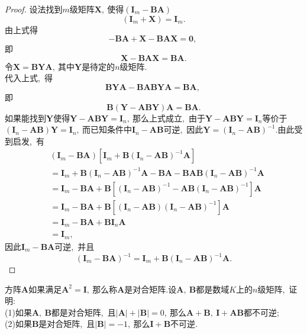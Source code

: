 \begin{proof}
	设法找到$m$级矩阵$\boldsymbol{X},\ $使得$(\boldsymbol{I}_m-\boldsymbol{BA})$
	$$(\boldsymbol{I}_m+\boldsymbol{X})=\boldsymbol{I}_m.$$
	由上式得
	$$-\boldsymbol{BA}+\boldsymbol{X}-\boldsymbol{BAX}=\boldsymbol{0},\ $$
	即
	$$\boldsymbol{X}-\boldsymbol{BAX}=\boldsymbol{BA}.$$
	令$\boldsymbol{X}=\boldsymbol{BYA},\ $其中$\boldsymbol{Y}$是待定的$n$级矩阵.\\
	代入上式,\ 得
	$$\boldsymbol{BYA}-\boldsymbol{BABYA}=\boldsymbol{BA},\ $$
	即
	$$\boldsymbol{B}(\boldsymbol{Y}-\boldsymbol{ABY})\boldsymbol{A}=\boldsymbol{BA}.$$
	如果能找到$\boldsymbol{Y}$使得$\boldsymbol{Y}-\boldsymbol{ABY}=\boldsymbol{I}_n,\ $那么上式成立,\ 由于$\boldsymbol{Y}-\boldsymbol{ABY}=\boldsymbol{I}_n$等价于$(\boldsymbol{I}_n-\boldsymbol{AB})\boldsymbol{Y}=\boldsymbol{I}_n,\ $而已知条件中$\boldsymbol{I}_n-\boldsymbol{AB}$可逆,\ 因此$\boldsymbol{Y}=(\boldsymbol{I}_n-\boldsymbol{AB})^{-1}.$由此受到启发,\ 有
	$$\begin{aligned}
		&(\boldsymbol{I}_m-\boldsymbol{BA})[\boldsymbol{I}_m+\boldsymbol{B}(\boldsymbol{I}_n-\boldsymbol{AB})^{-1}\boldsymbol{A}]\\
		&=\boldsymbol{I}_m+\boldsymbol{B}(\boldsymbol{I}_n-\boldsymbol{AB})^{-1}\boldsymbol{A}-\boldsymbol{BA}-\boldsymbol{BAB}(\boldsymbol{I}_n-\boldsymbol{AB})^{-1}\boldsymbol{A}\\
		&=\boldsymbol{I}_m-\boldsymbol{BA}+\boldsymbol{B}[(\boldsymbol{I}_n-\boldsymbol{AB})^{-1}-\boldsymbol{AB}(\boldsymbol{I}_n-\boldsymbol{AB})^{-1}]\boldsymbol{A}\\
		&=\boldsymbol{I}_m-\boldsymbol{BA}+\boldsymbol{B}[(\boldsymbol{I}_n-\boldsymbol{AB})(\boldsymbol{I}_n-\boldsymbol{AB})^{-1}]\boldsymbol{A}\\
		&=\boldsymbol{I}_m-\boldsymbol{BA}+\boldsymbol{B}\boldsymbol{I}_n\boldsymbol{A}\\
		&=\boldsymbol{I}_m,\ 
	\end{aligned}$$
	因此$\boldsymbol{I}_m-\boldsymbol{BA}$可逆,\ 并且
	$$(\boldsymbol{I}_m-\boldsymbol{BA})^{-1}=\boldsymbol{I}_m+\boldsymbol{B}(\boldsymbol{I}_n-\boldsymbol{AB})^{-1}\boldsymbol{A}.$$
\end{proof}
\newpage
\begin{problem}
	方阵$\boldsymbol{A}$如果满足$\boldsymbol{A}^2=\boldsymbol{I},\ $那么称$\boldsymbol{A}$是对合矩阵.设$\boldsymbol{A},\ \boldsymbol{B}$都是数域$K$上的$n$级矩阵,\ 证明:\\
	(1)如果$\boldsymbol{A},\ \boldsymbol{B}$都是对合矩阵,\ 且$|\boldsymbol{A}|+|\boldsymbol{B}|=0,\ $那么$\boldsymbol{A}+\boldsymbol{B},\ \boldsymbol{I}+\boldsymbol{AB}$都不可逆;\\
	(2)如果$\boldsymbol{B}$是对合矩阵,\ 且$|\boldsymbol{B}|=-1,\ $那么$\boldsymbol{I}+\boldsymbol{B}$不可逆.
\end{problem}
